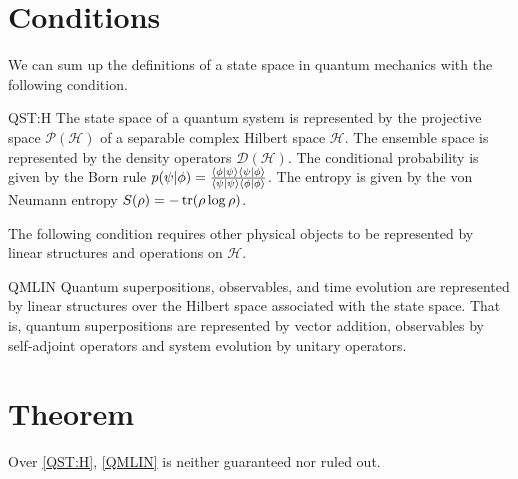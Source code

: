 \documentclass{techbrief}
\begin{document}
\section{Conditions}

We can sum up the definitions of a state space in quantum mechanics with the following condition.

\begin{condition}{QST:H}
	The state space of a quantum system is represented by the projective space $\mathcal{P}(\mathcal{H})$ of a separable complex Hilbert space $\mathcal{H}$. The ensemble space is represented by the density operators $\mathcal{D}(\mathcal{H})$. The conditional probability is given by the Born rule $p(\psi|\phi) = \frac{\langle \phi | \psi \rangle\langle \psi | \phi \rangle}{\langle \psi | \psi \rangle\langle \phi | \phi \rangle}$. The entropy is given by the von Neumann entropy $S(\rho) = -\operatorname{tr}(\rho \log \rho)$.
\end{condition}

The following condition requires other physical objects to be represented by linear structures and operations on $\mathcal{H}$.
\begin{condition}{QMLIN}
	Quantum superpositions, observables, and time evolution are represented by linear structures over the Hilbert space associated with the state space. That is, quantum superpositions are represented by vector addition, observables by self-adjoint operators and system evolution by unitary operators.
\end{condition}

\section{Theorem}

\begin{thrm}
	Over \ref{QST:H}, \ref{QMLIN} is neither guaranteed nor ruled out.
\end{thrm}
\end{document}

